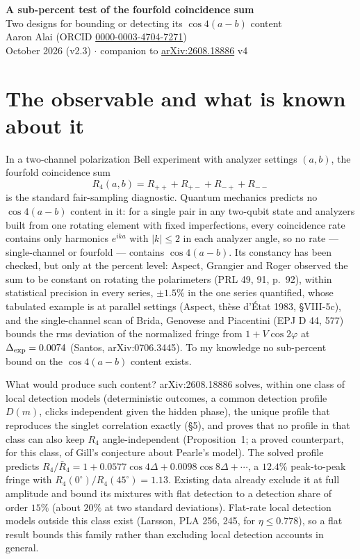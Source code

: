 \documentclass[10pt]{article}
\begin{document}
\begin{center}
{\Large\bfseries A sub-percent test of the fourfold coincidence sum}\\[3pt]
{\large Two designs for bounding or detecting its $\cos 4(a-b)$ content}\\[5pt]
Aaron Alai (ORCID \href{https://orcid.org/0000-0003-4704-7271}{0000-0003-4704-7271})\\
October 2026 (v2.3) $\cdot$ companion to \href{https://arxiv.org/abs/2608.18886}{arXiv:2608.18886} v4
\end{center}

\section*{The observable and what is known about it}
In a two-channel polarization Bell experiment with analyzer settings $(a,b)$, the fourfold coincidence sum
\[
R_4(a,b) = R_{++}+R_{+-}+R_{-+}+R_{--}
\]
is the standard fair-sampling diagnostic. Quantum mechanics predicts no $\cos 4(a-b)$ content in it: for a single pair in any two-qubit state and analyzers built from one rotating element with fixed imperfections, every coincidence rate contains only harmonics $e^{ika}$ with $|k|\le 2$ in each analyzer angle, so no rate --- single-channel or fourfold --- contains $\cos 4(a-b)$. Its constancy has been checked, but only at the percent level: Aspect, Grangier and Roger observed the sum to be constant on rotating the polarimeters (PRL 49, 91, p.~92), within statistical precision in every series, $\pm 1.5\%$ in the one series quantified, whose tabulated example is at parallel settings (Aspect, th\`ese d'\'Etat 1983, \S VIII-5c), and the single-channel scan of Brida, Genovese and Piacentini (EPJ D 44, 577) bounds the rms deviation of the normalized fringe from $1+V\cos 2\varphi$ at $\Delta_{\rm exp}=0.0074$ (Santos, arXiv:0706.3445). To my knowledge no sub-percent bound on the $\cos 4(a-b)$ content exists.

What would produce such content? arXiv:2608.18886 solves, within one class of local detection models (deterministic outcomes, a common detection profile $D(m)$, clicks independent given the hidden phase), the unique profile that reproduces the singlet correlation exactly (\S5), and proves that no profile in that class can also keep $R_4$ angle-independent (Proposition~1; a proved counterpart, for this class, of Gill's conjecture about Pearle's model). The solved profile predicts $R_4/\bar R_4 = 1 + 0.0577\cos 4\Delta + 0.0098\cos 8\Delta + \cdots$, a $12.4\%$ peak-to-peak fringe with $R_4(0^\circ)/R_4(45^\circ)=1.13$. Existing data already exclude it at full amplitude and bound its mixtures with flat detection to a detection share of order $15\%$ (about $20\%$ at two standard deviations). Flat-rate local detection models outside this class exist (Larsson, PLA 256, 245, for $\eta\le 0.778$), so a flat result bounds this family rather than excluding local detection accounts in general.
\end{document}
